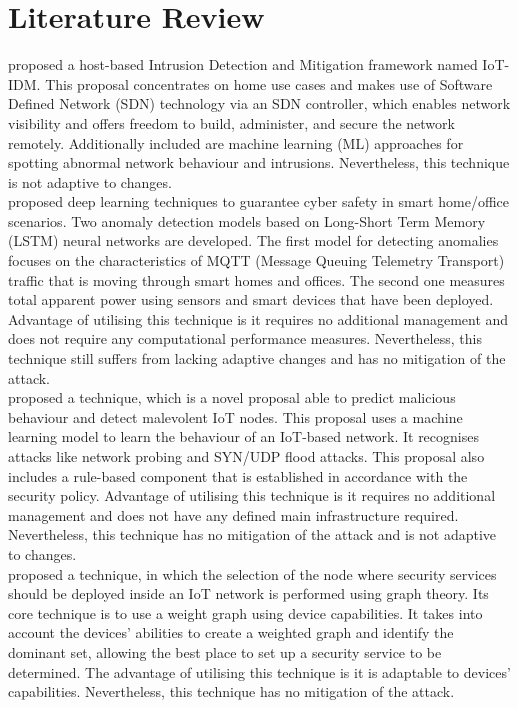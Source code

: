 \documentclass[12pt]{report}
\begin{document}
\section{Literature Review}
\indent
\cite{Nobakht} proposed a host-based Intrusion Detection and Mitigation framework named IoT-IDM. This proposal concentrates on home use cases and makes use of Software Defined Network (SDN) technology via an SDN controller, which enables network visibility and offers freedom to build, administer, and secure the network remotely. Additionally included are machine learning (ML) approaches for spotting abnormal network behaviour and intrusions. Nevertheless, this technique is not adaptive to changes. \\

\cite{Vakakis} proposed deep learning techniques to guarantee cyber safety in smart home/office scenarios. Two anomaly detection models based on Long-Short Term Memory (LSTM) neural networks are developed. The first model for detecting anomalies focuses on the characteristics of MQTT (Message Queuing Telemetry Transport) traffic that is moving through smart homes and offices. The second one measures total apparent power using sensors and smart devices that have been deployed. Advantage of utilising this technique is it requires no additional management and does not require any computational performance measures. Nevertheless, this technique still suffers from lacking adaptive changes and has no mitigation of the attack.\\

\cite{Anthi} proposed a technique, which is a novel proposal able to predict malicious behaviour and detect malevolent IoT nodes. This proposal uses a machine learning model to learn the behaviour of an IoT-based network. It recognises attacks like network probing and SYN/UDP flood attacks. This proposal also includes a rule-based component that is established in accordance with the security policy. Advantage of utilising this technique is it requires no additional management and does not have any defined main infrastructure required. Nevertheless, this technique has no mitigation of the attack and is not adaptive to changes.\\

\cite{Godquin} proposed a technique, in which the selection of the node where security services should be deployed inside an IoT network is performed using graph theory. Its core technique is to use a weight graph using device capabilities. It takes into account the devices' abilities to create a weighted graph and identify the dominant set, allowing the best place to set up a security service to be determined. The advantage of utilising this technique is it is adaptable to devices’ capabilities. Nevertheless, this technique has no mitigation of the attack.\\
\end{document}
